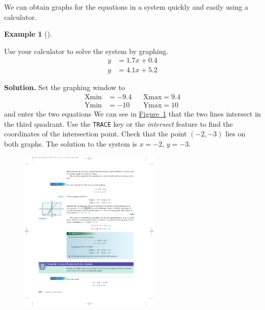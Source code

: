 \documentclass[10pt,]{book}
\theoremstyle{plain}
\theoremstyle{definition}
\theoremstyle{definition}
\newtheorem{example}[theorem]{Example}
\theoremstyle{definition}
\theoremstyle{definition}
\numberwithin{equation}{section}
\newcommand{\amp}{ & }
\begin{document}
	We can obtain graphs for the equations in a system quickly and easily using a calculator.
%
\begin{example}[]\label{example-GC-2x2-system}

		Use your calculator to solve the system by graphing.
		\begin{align*}

				y \amp = 1.7x + 0.4
			\\

				y \amp = 4.1x + 5.2
			
\end{align*}
\par\medskip\noindent%
\textbf{Solution.}\quad 
		Set the graphing window to
		\begin{align*}

				\text{Xmin} \amp = -9.4 \amp\amp \text{Xmax} = 9.4
			\\

				\text{Ymin} \amp = -10 \amp\amp \text{Ymax} = 10
			
\end{align*}
		and enter the two equations We can see in \hyperref[fig-GC-2x2-system]{Figure~\ref{fig-GC-2x2-system}} that the two lines intersect in the third quadrant. Use the \lstinline?TRACE? key or the \emph{intersect} feature to find the coordinates of the intersection point. Check that the point \((−2,−3)\) lies on both graphs. The solution to the system is \(x = −2\), \(y=-3\).
		\leavevmode%
\begin{figure}
\centering
\includegraphics[width=0.60\textwidth,]{images/fig-GC-2x2-system.pdf}\caption{\label{fig-GC-2x2-system}}
\end{figure}

\end{example}
\par
\end{document}

